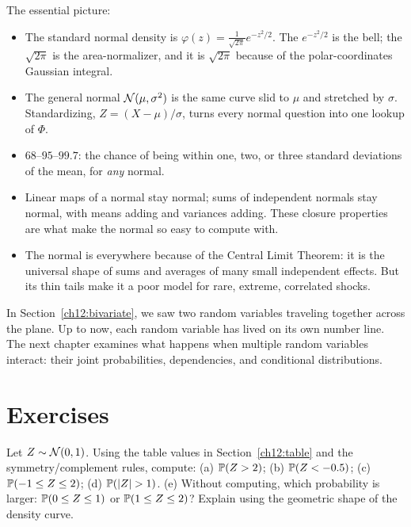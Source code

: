\begin{recoverybox}
The essential picture:
\begin{itemize}
  \item The standard normal density is $\varphi(z) = \frac{1}{\sqrt{2\pi}}e^{-z^2/2}$.
  The $e^{-z^2/2}$ is the bell; the $\sqrt{2\pi}$ is the area-normalizer, and
  it is $\sqrt{2\pi}$ because of the polar-coordinates Gaussian integral.
  \item The general normal $\Normal(\mu,\sigma^2)$ is the same curve slid to $\mu$
  and stretched by $\sigma$. Standardizing, $Z = (X-\mu)/\sigma$, turns every
  normal question into one lookup of $\Phi$.
  \item $68$--$95$--$99.7$: the chance of being within one, two, or three standard
  deviations of the mean, for \emph{any} normal.
  \item Linear maps of a normal stay normal; sums of independent normals stay
  normal, with means adding and variances adding. These closure properties are
  what make the normal so easy to compute with.
  \item The normal is everywhere because of the Central Limit Theorem: it is the
  universal shape of sums and averages of many small independent effects. But its
  thin tails make it a poor model for rare, extreme, correlated shocks.
\end{itemize}
\end{recoverybox}

In Section~\ref{ch12:bivariate}, we saw two random variables traveling together across the plane.
Up to now, each random variable has lived on its own number line.
The next chapter examines what happens when multiple random variables interact:
their joint probabilities, dependencies, and conditional distributions.

\section*{Exercises}

\begin{exercise}
\label{ch12:exr-read}
Let $Z \sim \Normal(0,1)$. Using the table values in Section~\ref{ch12:table} and
the symmetry/complement rules, compute:
(a) $\P(Z > 2)$; (b) $\P(Z < -0.5)$; (c) $\P(-1 \le Z \le 2)$;
(d) $\P(|Z| > 1)$.
(e) Without computing, which probability is larger: $\P(0 \le Z \le 1)$ or $\P(1 \le Z \le 2)$? Explain using the geometric shape of the density curve.
\end{exercise}

